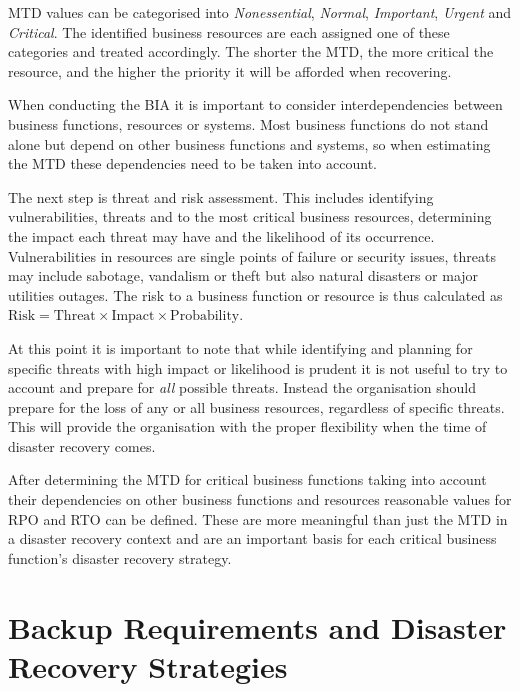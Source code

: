 \documentclass[a4paper,11pt,onecolumn]{scrartcl}
\begin{document}
MTD values can be categorised into \emph{Nonessential}, \emph{Normal},
\emph{Important}, \emph{Urgent} and \emph{Critical}. The identified
business resources are each assigned one of these categories and treated
accordingly. The shorter the MTD, the more critical the resource, and
the higher the priority it will be afforded when recovering.

When conducting the BIA it is important to consider interdependencies
between business functions, resources or systems. Most business
functions do not stand alone but depend on other business functions and
systems, so when estimating the MTD these dependencies need to be taken
into account. 

The next step is threat and risk assessment. This includes identifying
vulnerabilities, threats and to the most critical business resources,
determining the impact each threat may have and the likelihood of its
occurrence. Vulnerabilities in resources are single points of failure or
security issues, threats may include sabotage, vandalism or theft but
also natural disasters or major utilities outages. The risk to a
business function or resource is thus calculated as $\textrm{Risk} =
\textrm{Threat} \times \textrm{Impact} \times \textrm{Probability}$. 

At this point it is important to note that while identifying and
planning for specific threats with high impact or likelihood is prudent
it is not useful to try to account and prepare for \emph{all} possible
threats. Instead the organisation should prepare for the loss of any or
all business resources, regardless of specific threats. This will
provide the organisation with the proper flexibility when the time of
disaster recovery comes.

After determining the MTD for critical business functions taking into
account their dependencies on other business functions and resources
reasonable values for RPO and RTO can be defined. These are more
meaningful than just the MTD in a disaster recovery context and are an
important basis for each critical business function's disaster recovery
strategy.

\section{Backup Requirements and Disaster Recovery Strategies}
\end{document}
